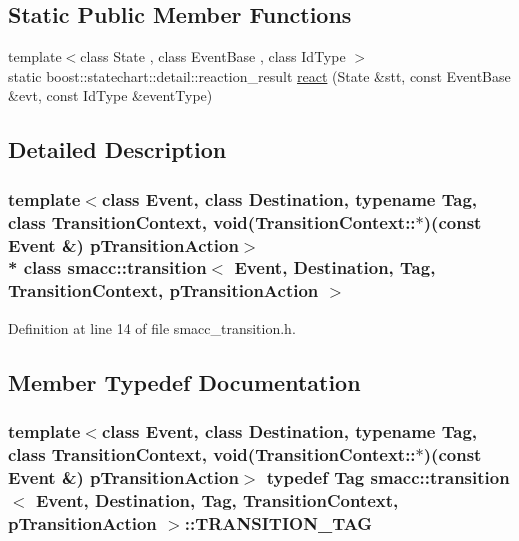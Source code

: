 \subsection*{Static Public Member Functions}
\begin{DoxyCompactItemize}
\item 
{\footnotesize template$<$class State , class Event\+Base , class Id\+Type $>$ }\\static boost\+::statechart\+::detail\+::reaction\+\_\+result \hyperlink{classsmacc_1_1transition_a41fff11020dee2706cd0353b946da13b}{react} (State \&stt, const Event\+Base \&evt, const Id\+Type \&event\+Type)
\end{DoxyCompactItemize}


\subsection{Detailed Description}
\subsubsection*{template$<$class Event, class Destination, typename Tag, class Transition\+Context, void(\+Transition\+Context\+::$\ast$)(const Event \&) p\+Transition\+Action$>$\\*
class smacc\+::transition$<$ Event, Destination, Tag, Transition\+Context, p\+Transition\+Action $>$}



Definition at line 14 of file smacc\+\_\+transition.\+h.



\subsection{Member Typedef Documentation}
\subsubsection[{\texorpdfstring{T\+R\+A\+N\+S\+I\+T\+I\+O\+N\+\_\+\+T\+AG}{TRANSITION_TAG}}]{\setlength{\rightskip}{0pt plus 5cm}template$<$class Event, class Destination, typename Tag, class Transition\+Context, void(\+Transition\+Context\+::$\ast$)(const Event \&) p\+Transition\+Action$>$ typedef Tag {\bf smacc\+::transition}$<$ Event, Destination, Tag, Transition\+Context, p\+Transition\+Action $>$\+::{\bf T\+R\+A\+N\+S\+I\+T\+I\+O\+N\+\_\+\+T\+AG}}\hypertarget{classsmacc_1_1transition_a54c8023d8bdcdddfb18c3f5b7a9d2e32}{}\label{classsmacc_1_1transition_a54c8023d8bdcdddfb18c3f5b7a9d2e32}


